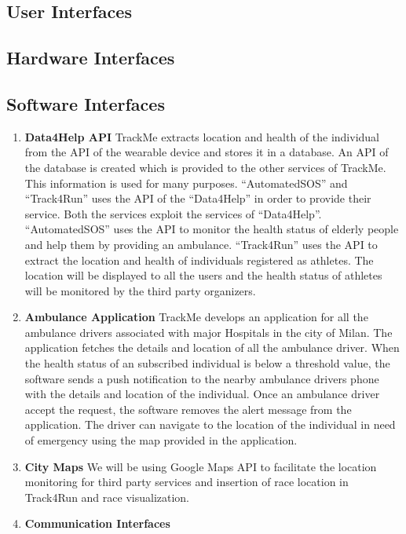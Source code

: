 \subsection{User Interfaces}


\subsection{Hardware Interfaces}


\subsection{Software Interfaces}
\begin{enumerate}
\item \textbf{Data4Help API}
\newline \qquad TrackMe extracts location and health of the individual from the API of the   wearable device and stores it in a database. An API of the database is created which is provided to the other services of TrackMe. This information is used for many purposes. “AutomatedSOS” and “Track4Run” uses the API of the “Data4Help” in order to provide their service. Both the services exploit the services of “Data4Help”. “AutomatedSOS” uses the API to monitor the health status of elderly people and help them by providing an ambulance. “Track4Run” uses the API to extract the location and health of individuals registered as athletes. The location will be displayed to all the users and the health status of athletes will be monitored by the third party organizers.
\item \textbf{Ambulance Application}
\newline\qquad TrackMe develops an application for all the ambulance drivers associated with major Hospitals in the city of Milan. The application fetches the details and location of all the ambulance driver. When the health status of an subscribed individual is below a threshold value, the software sends a push notification to the nearby ambulance drivers phone with the details and location of the individual. Once an ambulance driver accept the request, the software removes the alert message from the application. The driver can navigate to the location of the individual in need of emergency using the map provided in the application.
\item \textbf{City Maps}
\newline\qquad We will be using Google Maps API to facilitate the location monitoring for third party services and insertion of race location in Track4Run and race visualization.
\item \textbf{Communication Interfaces}
\end{enumerate}
